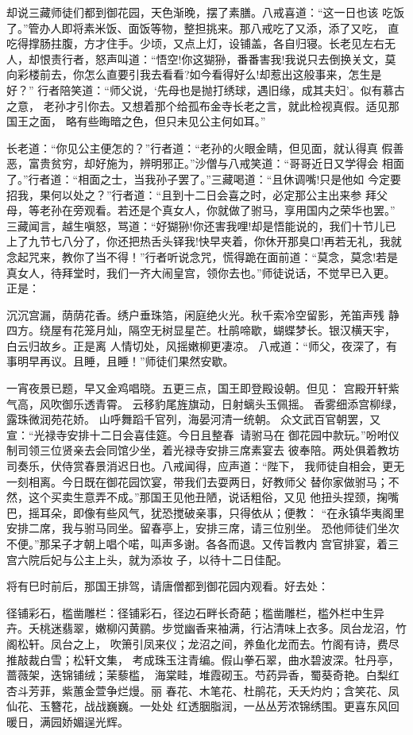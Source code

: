 却说三藏师徒们都到御花园，天色渐晚，摆了素膳。八戒喜道：“这一日也该
吃饭了。”管办人即将素米饭、面饭等物，整担挑来。那八戒吃了又添，添了又吃，
直吃得撑肠拄腹，方才住手。少顷，又点上灯，设铺盖，各自归寝。长老见左右无
人，却恨责行者，怒声叫道：“悟空!你这猢狲，番番害我!我说只去倒换关文，莫
向彩楼前去，你怎么直要引我去看看?如今看得好么!却惹出这般事来，怎生是好？”
行者陪笑道：“师父说，‘先母也是抛打绣球，遇旧缘，成其夫妇’。似有慕古之意，
老孙才引你去。又想着那个给孤布金寺长老之言，就此检视真假。适见那国王之面，
略有些晦暗之色，但只未见公主何如耳。”

长老道：“你见公主便怎的？”行者道：“老孙的火眼金睛，但见面，就认得真
假善恶，富贵贫穷，却好施为，辨明邪正。”沙僧与八戒笑道：“哥哥近日又学得会
相面了。”行者道：“相面之士，当我孙子罢了。”三藏喝道：“且休调嘴!只是他如
今定要招我，果何以处之？”行者道：“且到十二日会喜之时，必定那公主出来参
拜父母，等老孙在旁观看。若还是个真女人，你就做了驸马，享用国内之荣华也罢。”
三藏闻言，越生嗔怒，骂道：“好猢狲!你还害我哩!却是悟能说的，我们十节儿已
上了九节七八分了，你还把热舌头铎我!快早夹着，你休开那臭口!再若无礼，我就
念起咒来，教你了当不得！”行者听说念咒，慌得跪在面前道：“莫念，莫念!若是
真女人，待拜堂时，我们一齐大闹皇宫，领你去也。”师徒说话，不觉早已入更。
正是：

沉沉宫漏，荫荫花香。绣户垂珠箔，闲庭绝火光。秋千索冷空留影，羌笛声残
静四方。绕屋有花笼月灿，隔空无树显星芒。杜鹃啼歇，蝴蝶梦长。银汉横天宇，
白云归故乡。正是离
人情切处，风摇嫩柳更凄凉。
八戒道：“师父，夜深了，有事明早再议。且睡，且睡！”师徒们果然安歇。

一宵夜景已题，早又金鸡唱晓。五更三点，国王即登殿设朝。但见：
宫殿开轩紫气高，风吹御乐透青霄。
云移豹尾旌旗动，日射螭头玉佩摇。
香雾细添宫柳绿，露珠微润苑花娇。
山呼舞蹈千官列，海晏河清一统朝。
众文武百官朝罢，又宣：“光禄寺安排十二日会喜佳筵。今日且整春，请驸马在
御花园中款玩。”吩咐仪制司领三位贤亲去会同馆少坐，着光禄寺安排三席素宴去
彼奉陪。两处俱着教坊司奏乐，伏侍赏春景消迟日也。八戒闻得，应声道：“陛下，
我师徒自相会，更无一刻相离。今日既在御花园饮宴，带我们去耍两日，好教师父
替你家做驸马；不然，这个买卖生意弄不成。”那国王见他丑陋，说话粗俗，又见
他扭头捏颈，掬嘴巴，摇耳朵，即像有些风气，犹恐搅破亲事，只得依从；便教：
“在永镇华夷阁里安排二席，我与驸马同坐。留春亭上，安排三席，请三位别坐。
恐他师徒们坐次不便。”那呆子才朝上唱个喏，叫声多谢。各各而退。又传旨教内
宫官排宴，着三宫六院后妃与公主上头，就为添妆子，以待十二日佳配。

将有巳时前后，那国王排驾，请唐僧都到御花园内观看。好去处：

径铺彩石，槛凿雕栏：径铺彩石，径边石畔长奇葩；槛凿雕栏，槛外栏中生异
卉。夭桃迷翡翠，嫩柳闪黄鹂。步觉幽香来袖满，行沾清味上衣多。凤台龙沼，竹
阁松轩。凤台之上，
吹箫引凤来仪；龙沼之间，养鱼化龙而去。竹阁有诗，费尽推敲裁白雪；松轩文集，
考成珠玉注青编。假山拳石翠，曲水碧波深。牡丹亭，蔷薇架，迭锦铺绒；茉藜槛，
海棠畦，堆霞砌玉。芍药异香，蜀葵奇艳。白梨红杏斗芳菲，紫蕙金萱争烂熳。丽
春花、木笔花、杜鹃花，夭夭灼灼；含笑花、凤仙花、玉簪花，战战巍巍。一处处
红透胭脂润，一丛丛芳浓锦绣围。更喜东风回暖日，满园娇媚逞光辉。


